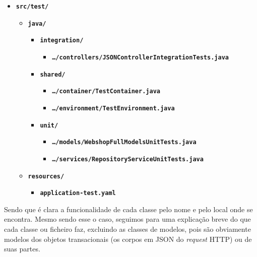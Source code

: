 \newpage

\begin{itemize}
        \item \texttt{\textbf{src/test/}}\begin{itemize}
                      \item \texttt{\textbf{java/}}\begin{itemize}
                                    \item \texttt{\textbf{integration/}}\begin{itemize}
                                                  \item \texttt{\textbf{\ldots/controllers/JSONControllerIntegrationTests.java}}
                                          \end{itemize}
                                    \item \texttt{\textbf{shared/}}\begin{itemize}
                                                  \item \texttt{\textbf{\ldots/container/TestContainer.java}}
                                                  \item \texttt{\textbf{\ldots/environment/TestEnvironment.java}}
                                          \end{itemize}
                                    \item \texttt{\textbf{unit/}}\begin{itemize}
                                                  \item \texttt{\textbf{\ldots/models/WebshopFullModelsUnitTests.java}}
                                                  \item \texttt{\textbf{\ldots/services/RepositoryServiceUnitTests.java}}
                                          \end{itemize}
                            \end{itemize}
                      \item \texttt{\textbf{resources/}}\begin{itemize}
                                    \item \texttt{\textbf{application-test.yaml}}
                            \end{itemize}
              \end{itemize}
\end{itemize}

Sendo que é clara a funcionalidade de cada classe pelo nome e pelo local onde se encontra. Mesmo sendo esse o caso, seguimos para uma explicação breve do que cada classe ou ficheiro faz, excluindo as classes de modelos, pois são obviamente modelos dos objetos transacionais (os corpos em JSON do \textit{request} HTTP) ou de suas partes.

